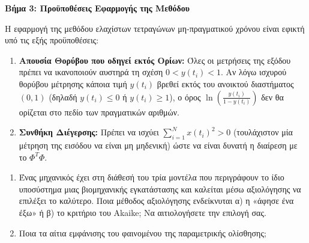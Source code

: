 \documentclass[a4paper,11pt]{article}
\begin{document}
\begin{answer}
\textbf{Βήμα 3: Προϋποθέσεις Εφαρμογής της Μεθόδου}

Η εφαρμογή της μεθόδου ελαχίστων τετραγώνων μη-πραγματικού χρόνου είναι εφικτή υπό τις εξής προϋποθέσεις:
\begin{enumerate}
    \item \textbf{Απουσία Θορύβου που οδηγεί εκτός Ορίων:} Όλες οι μετρήσεις της εξόδου πρέπει να ικανοποιούν αυστηρά τη σχέση $0 < y(t_i) < 1$. Αν λόγω ισχυρού θορύβου μέτρησης κάποια τιμή $y(t_i)$ βρεθεί εκτός του ανοικτού διαστήματος $(0, 1)$ (δηλαδή $y(t_i) \le 0$ ή $y(t_i) \ge 1$), ο όρος $\ln\left(\frac{y(t_i)}{1-y(t_i)}\right)$ δεν θα ορίζεται στο πεδίο των πραγματικών αριθμών.
    \item \textbf{Συνθήκη Διέγερσης:} Πρέπει να ισχύει $\sum_{i=1}^N x(t_i)^2 > 0$ (τουλάχιστον μία μέτρηση της εισόδου να είναι μη μηδενική) ώστε να είναι δυνατή η διαίρεση με το $\Phi^T \Phi$.
\end{enumerate}
\end{answer}

\begin{question}
\begin{enumerate}[label=\alph*)]
    \item Ένας μηχανικός έχει στη διάθεσή του τρία μοντέλα που περιγράφουν το ίδιο υποσύστημα μιας βιομηχανικής εγκατάστασης και καλείται μέσω αξιολόγησης να επιλέξει το καλύτερο. Ποια μέθοδος αξιολόγησης ενδείκνυται α) η «άφησε ένα έξω» ή β) το κριτήριο του Akaike; Να αιτιολογήσετε την επιλογή σας.
    \item Ποια τα αίτια εμφάνισης του φαινομένου της παραμετρικής ολίσθησης;
\end{enumerate}
\end{question}
\end{document}
